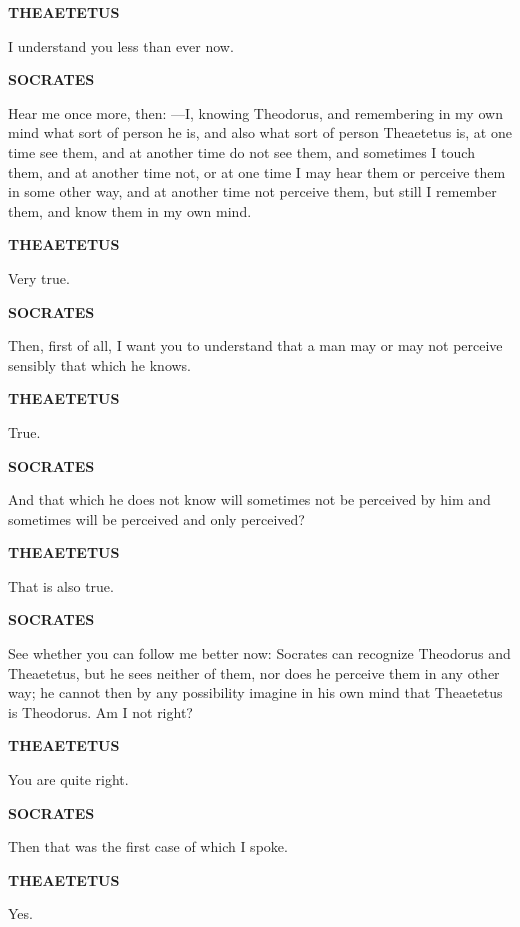 \documentclass[11pt,letter]{article}
\begin{document}
\par \textbf{THEAETETUS}
\par   I understand you less than ever now.

\par \textbf{SOCRATES}
\par   Hear me once more, then: —I, knowing Theodorus, and remembering in my own mind what sort of person he is, and also what sort of person Theaetetus is, at one time see them, and at another time do not see them, and sometimes I touch them, and at another time not, or at one time I may hear them or perceive them in some other way, and at another time not perceive them, but still I remember them, and know them in my own mind.

\par \textbf{THEAETETUS}
\par   Very true.

\par \textbf{SOCRATES}
\par   Then, first of all, I want you to understand that a man may or may not perceive sensibly that which he knows.

\par \textbf{THEAETETUS}
\par   True.

\par \textbf{SOCRATES}
\par   And that which he does not know will sometimes not be perceived by him and sometimes will be perceived and only perceived?

\par \textbf{THEAETETUS}
\par   That is also true.

\par \textbf{SOCRATES}
\par   See whether you can follow me better now:  Socrates can recognize Theodorus and Theaetetus, but he sees neither of them, nor does he perceive them in any other way; he cannot then by any possibility imagine in his own mind that Theaetetus is Theodorus. Am I not right?

\par \textbf{THEAETETUS}
\par   You are quite right.

\par \textbf{SOCRATES}
\par   Then that was the first case of which I spoke.

\par \textbf{THEAETETUS}
\par   Yes.
\end{document}
